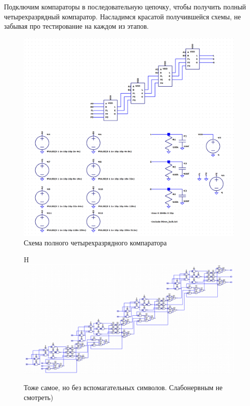 \documentclass[12pt,onecolumn]{article}
\begin{document}
Подключим компараторы в последовательную цепочку, чтобы получить полный четырехразрядный компаратор.
Насладимся красатой получившейся схемы, не забывая про тестирование на каждом из этапов.
\begin{figure}[H]
    \centering
    \includegraphics[width=\textwidth]{image/full-comparator.png}
    \caption{Схема полного четырехразрядного компаратора}
\end{figure}
\begin{figure}{H}
    \centering
    \includegraphics[width=\textwidth]{image/full-comparator4-all-in-one.png}
    \caption{Тоже самое, но без вспомагательных символов. Слабонервным не смотреть) }
\end{figure}
\end{document}
